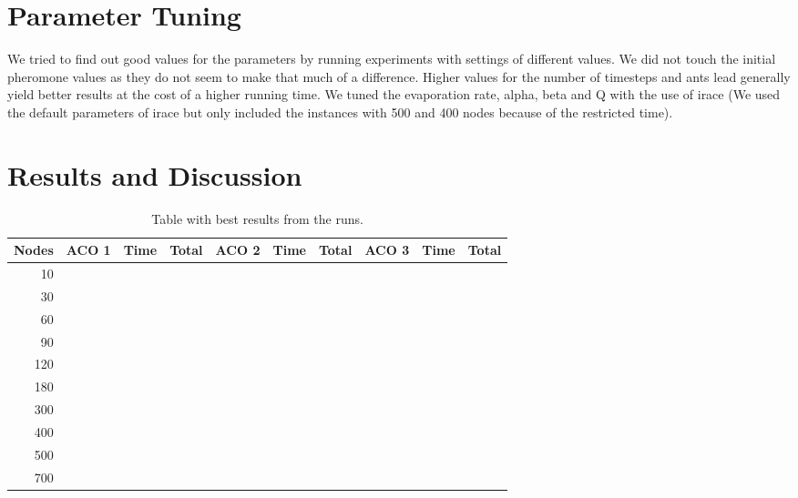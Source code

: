 \documentclass[a4paper]{scrartcl}
\begin{document}
\section{Parameter Tuning}
We tried to find out good values for the parameters by running experiments with settings of different values. We did not touch the initial pheromone values as they do not seem to make that much of a difference. Higher values for the number of timesteps and ants lead generally yield better results at the cost of a higher running time.
We tuned the evaporation rate, alpha, beta and Q with the use of irace \cite{lopez2011irace} (We used the default parameters of irace but only included the instances with 500 and 400 nodes because of the restricted time).


\section{Results and Discussion}


\begin{table}
    \begin{adjustwidth}{-.5in}{-.5in}  
        \begin{center}
\begin{tabular}{r | r | r | r | r | r | r | r | r | r}
\hline
Nodes & ACO 1 & Time & Total & ACO 2 & Time & Total & ACO 3 & Time & Total \\
\hline \hline 
10 &  &  &  &  &  &  &  &  &  \\
\hline
30 &  &  &  &  &  &  &  &  &  \\
\hline
60 &  &  &  &  &  &  &  &  &  \\
\hline
90 &  &  &  &  &  &  &  &  &  \\
\hline
120 &  &  &  &  &  &  &  &  &  \\
\hline
180 &  &  &  &  &  &  &  &  &  \\
\hline
300 &  &  &  &  &  &  &  &  &  \\
\hline
400 &  &  &  &  &  &  &  &  &  \\
\hline
500 &  &  &  &  &  &  &  &  &  \\
\hline
700 &  &  &  &  &  &  &  &  &  \\
\hline
\end{tabular}

        \caption{Table with best results from the runs. }
        \label{myTable}
        \end{center}
    \end{adjustwidth}
\end{table}



\end{document}
